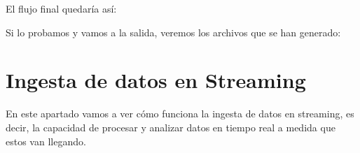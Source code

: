 \documentclass{../../miPlantilla}
\begin{document}

El flujo final quedaría así:


Si lo probamos y vamos a la salida, veremos los archivos que se han generado:


\section{Ingesta de datos en Streaming}
En este apartado vamos a ver cómo funciona la ingesta de datos en streaming, es decir, la capacidad de procesar y analizar datos en tiempo
real a medida que estos van llegando.
\end{document}
